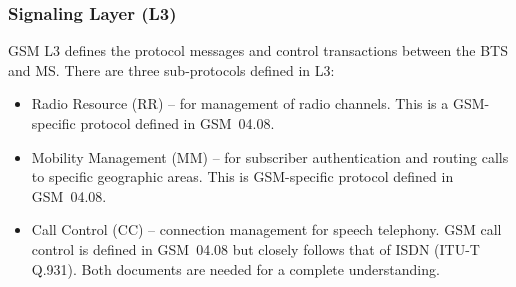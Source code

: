 \documentclass[11pt]{book}
\begin{document}
\subsubsection{Signaling Layer (L3)}
GSM L3 defines the protocol messages and control transactions between the BTS and MS. There are three sub-protocols defined in L3:
\begin{itemize}
	\item Radio Resource (RR) -- for management of radio channels. This is a GSM-specific protocol defined in GSM~04.08.
	\item Mobility Management (MM) -- for subscriber authentication and routing calls to specific geographic areas. This is GSM-specific protocol defined in GSM~04.08.
	\item Call Control (CC) -- connection management for speech telephony. GSM call control is defined in GSM~04.08 but closely follows that of ISDN (ITU-T Q.931).  Both documents are needed for a complete understanding.
\end{itemize}
\end{document}
